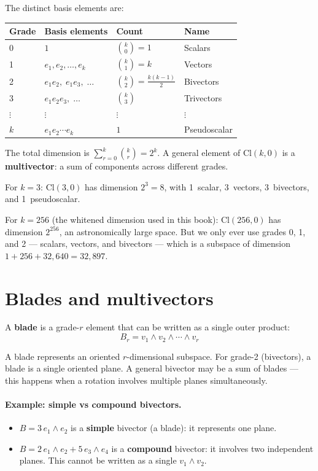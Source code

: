 \documentclass[11pt, twoside, openright]{memoir}
\newcommand{\op}{\wedge}          %
\numberwithin{equation}{chapter}
\begin{document}
The distinct basis elements are:
\begin{center}
\renewcommand{\arraystretch}{1.3}\small
\begin{tabular}{@{}l l l l@{}}
\toprule
\textbf{Grade} & \textbf{Basis elements} & \textbf{Count} & \textbf{Name} \\
\midrule
0 & $1$ & $\binom{k}{0} = 1$ & Scalars \\
1 & $e_1, e_2, \ldots, e_k$ & $\binom{k}{1} = k$ & Vectors \\
2 & $e_1 e_2, \; e_1 e_3, \; \ldots$ & $\binom{k}{2} = \frac{k(k-1)}{2}$ & Bivectors \\
3 & $e_1 e_2 e_3, \; \ldots$ & $\binom{k}{3}$ & Trivectors \\
$\vdots$ & $\vdots$ & $\vdots$ & $\vdots$ \\
$k$ & $e_1 e_2 \cdots e_k$ & $1$ & Pseudoscalar \\
\bottomrule
\end{tabular}
\end{center}

The total dimension is $\sum_{r=0}^k \binom{k}{r} = 2^k$.  A general
element of $\mathrm{Cl}(k, 0)$ is a \textbf{multivector}: a sum of
components across different grades.

For $k = 3$: $\mathrm{Cl}(3,0)$ has dimension $2^3 = 8$, with
1~scalar, 3~vectors, 3~bivectors, and 1~pseudoscalar.

For $k = 256$ (the whitened dimension used in this book): $\mathrm{Cl}(256, 0)$
has dimension $2^{256}$, an astronomically large space.  But we only
ever use grades 0, 1, and 2 --- scalars, vectors, and bivectors --- which
is a subspace of dimension $1 + 256 + 32{,}640 = 32{,}897$.

\section{Blades and multivectors}

A \textbf{blade} is a grade-$r$ element that can be written as a single
outer product:
\begin{equation}
  B_r = v_1 \op v_2 \op \cdots \op v_r
\end{equation}

A blade represents an oriented $r$-dimensional subspace.  For grade-2
(bivectors), a blade is a single oriented plane.  A general bivector
may be a sum of blades --- this happens when a rotation involves
multiple planes simultaneously.

\paragraph{Example: simple vs compound bivectors.}
\begin{itemize}[nosep]
\item $B = 3 \, e_1 \op e_2$ is a \textbf{simple} bivector (a blade):
  it represents one plane.
\item $B = 2 \, e_1 \op e_2 + 5 \, e_3 \op e_4$ is a \textbf{compound}
  bivector: it involves two independent planes.  This cannot be written
  as a single $v_1 \op v_2$.
\end{itemize}
\end{document}
